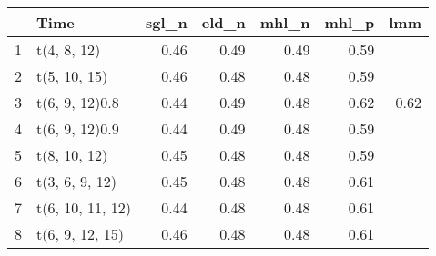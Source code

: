 \begin{table}[ht]
\centering
\begin{tabular}{rlrrrrr}
  \hline
 & Time & sgl\_n & eld\_n & mhl\_n & mhl\_p & lmm \\ 
  \hline
1 & t(4, 8, 12) & 0.46 & 0.49 & 0.49 & 0.59 &  \\ 
  2 & t(5, 10, 15) & 0.46 & 0.48 & 0.48 & 0.59 &  \\ 
  3 & t(6, 9, 12)0.8 & 0.44 & 0.49 & 0.48 & 0.62 & 0.62 \\ 
  4 & t(6, 9, 12)0.9 & 0.44 & 0.49 & 0.48 & 0.59 &  \\ 
  5 & t(8, 10, 12) & 0.45 & 0.48 & 0.48 & 0.59 &  \\ 
  6 & t(3, 6, 9, 12) & 0.45 & 0.48 & 0.48 & 0.61 &  \\ 
  7 & t(6, 10, 11, 12) & 0.44 & 0.48 & 0.48 & 0.61 &  \\ 
  8 & t(6, 9, 12, 15) & 0.46 & 0.48 & 0.48 & 0.61 &  \\ 
   \hline
\end{tabular}
\end{table}
